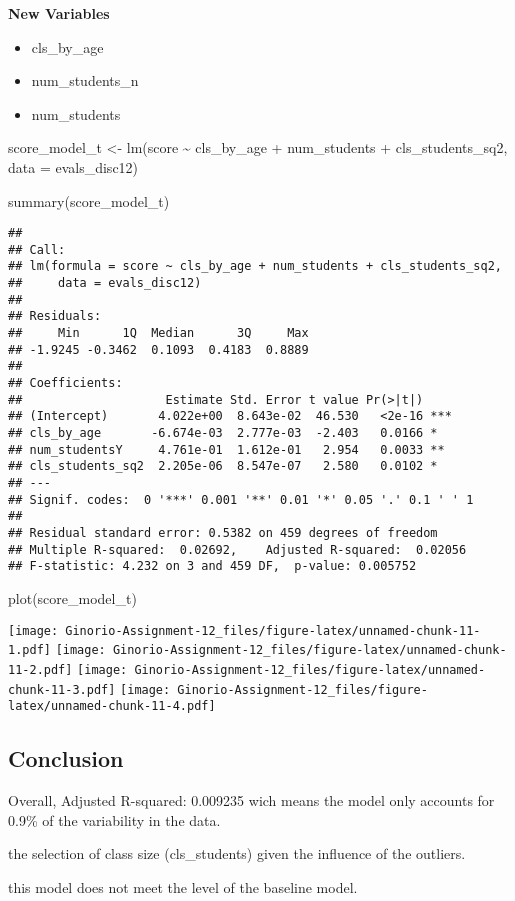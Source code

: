 \documentclass[
]{article}
\newenvironment{Shaded}{\begin{snugshade}}{\end{snugshade}}
\newcommand{\AttributeTok}[1]{\textcolor[rgb]{0.77,0.63,0.00}{#1}}
\newcommand{\FunctionTok}[1]{\textcolor[rgb]{0.00,0.00,0.00}{#1}}
\newcommand{\NormalTok}[1]{#1}
\newcommand{\OtherTok}[1]{\textcolor[rgb]{0.56,0.35,0.01}{#1}}
\newcommand{\SpecialCharTok}[1]{\textcolor[rgb]{0.00,0.00,0.00}{#1}}
\begin{document}
\textbf{New Variables}

\begin{itemize}
\item
  cls\_by\_age
\item
  num\_students\_n
\item
  num\_students
\end{itemize}

\begin{Shaded}
\begin{Highlighting}[]
\NormalTok{score\_model\_t }\OtherTok{\textless{}{-}} \FunctionTok{lm}\NormalTok{(score }\SpecialCharTok{\textasciitilde{}}\NormalTok{ cls\_by\_age }\SpecialCharTok{+}\NormalTok{ num\_students }\SpecialCharTok{+}\NormalTok{ cls\_students\_sq2, }\AttributeTok{data =}\NormalTok{ evals\_disc12)}

\FunctionTok{summary}\NormalTok{(score\_model\_t)}
\end{Highlighting}
\end{Shaded}

\begin{verbatim}
## 
## Call:
## lm(formula = score ~ cls_by_age + num_students + cls_students_sq2, 
##     data = evals_disc12)
## 
## Residuals:
##     Min      1Q  Median      3Q     Max 
## -1.9245 -0.3462  0.1093  0.4183  0.8889 
## 
## Coefficients:
##                    Estimate Std. Error t value Pr(>|t|)    
## (Intercept)       4.022e+00  8.643e-02  46.530   <2e-16 ***
## cls_by_age       -6.674e-03  2.777e-03  -2.403   0.0166 *  
## num_studentsY     4.761e-01  1.612e-01   2.954   0.0033 ** 
## cls_students_sq2  2.205e-06  8.547e-07   2.580   0.0102 *  
## ---
## Signif. codes:  0 '***' 0.001 '**' 0.01 '*' 0.05 '.' 0.1 ' ' 1
## 
## Residual standard error: 0.5382 on 459 degrees of freedom
## Multiple R-squared:  0.02692,    Adjusted R-squared:  0.02056 
## F-statistic: 4.232 on 3 and 459 DF,  p-value: 0.005752
\end{verbatim}

\begin{Shaded}
\begin{Highlighting}[]
\FunctionTok{plot}\NormalTok{(score\_model\_t)}
\end{Highlighting}
\end{Shaded}

\texttt{[image: Ginorio-Assignment-12\_files/figure-latex/unnamed-chunk-11-1.pdf]}
\texttt{[image: Ginorio-Assignment-12\_files/figure-latex/unnamed-chunk-11-2.pdf]}
\texttt{[image: Ginorio-Assignment-12\_files/figure-latex/unnamed-chunk-11-3.pdf]}
\texttt{[image: Ginorio-Assignment-12\_files/figure-latex/unnamed-chunk-11-4.pdf]}

\hypertarget{conclusion}{%
\subsection{Conclusion}\label{conclusion}}

Overall, Adjusted R-squared: 0.009235 wich means the model only accounts
for 0.9\% of the variability in the data.

the selection of class size (cls\_students) given the influence of the
outliers.

this model does not meet the level of the baseline model.
\end{document}
